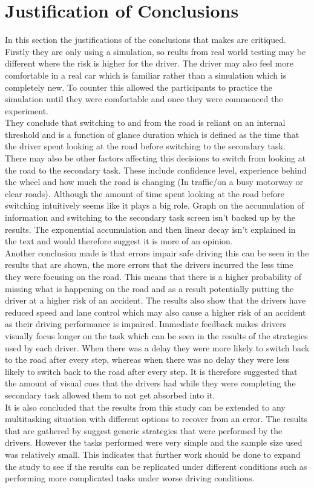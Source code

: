 \documentclass[12pt]{article}
\begin{document}
\section{Justification of Conclusions}
In this section the justifications of  the conclusions that \cite{Lee} makes are critiqued. Firstly they are only using a simulation, so reults from real world testing may be different where the risk is higher for the driver. The driver may also feel more comfortable in a real car which is familiar rather than a simulation which is completely new. To counter this \cite{Lee} allowed the participants to practice the simulation until they were comfortable and once they were commenced the experiment. \\
They conclude that switching to and from the road is reliant on an internal threshold and is a function of glance duration which is defined as the time that the driver spent looking at the road before switching to the secondary task. There may also be other factors affecting this decisions to switch from looking at the road to the secondary task. These include confidence level, experience behind the wheel and how much the road is changing (In traffic/on a busy motorway or clear roads). Although the amount of time spent looking at the road before switching intuitively seems like it plays a big role. Graph on the accumulation of information and switching to the secondary task screen isn't backed up by the results. The exponential accumulation and then linear decay isn't explained in the text and would therefore suggest it is more of an opinion. \\
Another conclusion made is that errors impair safe driving this can be seen in the results that are shown, the more errors that the drivers incurred the less time they were focusing on the road. This means that there is a higher probability of missing what is happening on the road and as a result potentially putting the driver at a higher risk of an accident. The results also show that the drivers have reduced speed and lane control which may also cause a higher risk of an accident as their driving performance is impaired. 
Immediate feedback makes drivers visually focus longer on the task which can be seen in the results of the strategies used by each driver. When there was a delay they were more likely to switch back to the road after every step, whereas when there was no delay they were less likely to switch back to the road after every step. It is therefore suggested that the amount of visual cues that the drivers had while they were completing the secondary task allowed them to not get absorbed into it. \\
It is also concluded that the results from this study can be extended to any multitasking situation with different options to recover from an error. The results that are gathered by \cite{Lee} suggest generic strategies that were performed by the drivers. However the tasks performed were very simple and the sample size used was relatively small. This indicates that further work should be done to expand the study to see if the results can be replicated under different conditions such as performing more complicated tasks under worse driving conditions. 
\end{document}
